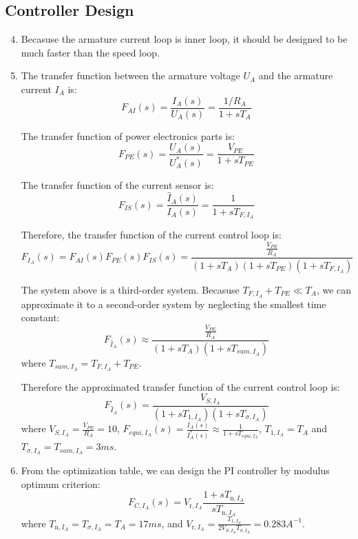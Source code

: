 \documentclass[12pt,a4paper, openany]{book}
\begin{document}
\subsection{Controller Design}

\begin{enumerate}
\setcounter{enumi}{3} %
\item {\bf *} Becasuse the armature current loop is inner loop, it should be designed to be much faster than the speed loop. 
\item {\bf *} 
The transfer function between the armature voltage $U_A$ and the armature current $I_A$ is:
\begin{equation}
    F_{AI}(s) = \frac{I_A(s)}{U_A(s)} = \frac{1/R_A}{1 + sT_A}
\end{equation}

The transfer function of power electronics parts is:
\begin{equation}
    F_{PE}(s) = \frac{U_A(s)}{U^*_A(s)} = \frac{V_{PE}}{1 + sT_{PE}}
\end{equation}

The transfer function of the current sensor is:
\begin{equation}
    F_{IS}(s) = \frac{\hat{I}_A(s)}{I_A(s)} = \frac{1}{1 + sT_{F,I_A}}
\end{equation}

Therefore, the transfer function of the current control loop is:
\begin{equation}
    F_{I_A}(s) = F_{AI}(s) F_{PE}(s) F_{IS}(s)= \frac{\frac{V_{PE}}{R_A}}{(1 + sT_A)(1 + sT_{PE})(1 + sT_{F,I_A})}
\end{equation}

The system above is a third-order system. Becasuse $T_{F,I_A}+T_{PE} \ll T_A$, we can approximate it to a second-order system by neglecting the smallest time constant:
\begin{equation}
    F_{\hat{I}_A}(s) \approx \frac{\frac{V_{PE}}{R_A}}{(1 + sT_A)(1 + sT_{sum,I_A})}
\end{equation}
where $T_{sum,I_A} = T_{F,I_A} + T_{PE}$.

Therefore the approximated transfer function of the current control loop is:
\begin{equation}
    F_{\hat{I}_A}(s)= \frac{V_{S,I_A}}{(1+sT_{1,I_A})(1+sT_{\sigma,I_A})}
\end{equation}
where $V_{S,I_A} = \frac{V_{PE}}{R_A}=10$, $F_{equi,I_A}(s)=\frac{I_A(s)}{I_A^*(s)}\approx\frac{1}{1+sT_{equi,I_A}}$, $T_{1,I_A} = T_A$ and $T_{\sigma,I_A} = T_{sum,I_A}=3ms$.
\item {\bf *} From the optimization table, we can design the PI controller by modulus optimum criterion:
\begin{equation}
    F_{C,I_A}(s)=V_{\mathrm{r},I_A}\frac{1+sT_{\mathrm{n},I_A}}{sT_{\mathrm{n},I_A}}
\end{equation}
where $T_{\mathrm{n},I_A} = T_{\sigma,I_A}=T_A=17ms$, and $V_{\mathrm{r},I_A} = \frac{T_{1,I_A}}{2V_{S,I_A}T_{\sigma,I_A}} = 0.283A^{-1}$. 
\end{enumerate}
\end{document}
